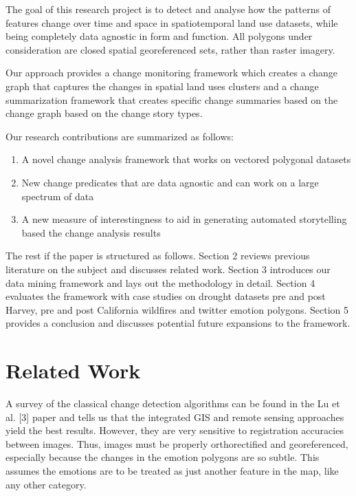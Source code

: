 \documentclass[conference]{IEEEtran}
\begin{document}
The goal of this research project is to detect and analyse how the patterns of features change over time and space in spatiotemporal land use datasets, while being completely data agnostic in form and function. All polygons under consideration are closed spatial  georeferenced sets, rather than raster imagery.

Our approach provides a change monitoring framework which creates a change graph that captures the changes in spatial land uses clusters and a change summarization framework that creates specific change summaries based on the change graph based on the change story types. 

Our research contributions are summarized as follows:

\begin{enumerate}
 \item A novel change analysis framework that works on vectored polygonal datasets
 \item New change predicates that are data agnostic and can work on a large spectrum of data
 \item A new measure of interestingness to aid in generating automated storytelling based the change analysis results
\end{enumerate}

The rest if the paper is structured as follows. Section 2 reviews previous literature on the subject and discusses related work.  Section 3 introduces our data mining framework and lays out the methodology in detail. Section 4 evaluates the framework with case studies on drought datasets pre and post Harvey, pre and post California wildfires and twitter emotion polygons. Section 5 provides a conclusion and discusses potential future expansions to the framework.


\section{Related Work}

A survey of the classical change detection algorithms can be found in the Lu et al. [3] paper and tells us that the integrated GIS and remote sensing approaches yield the best results. However, they are very sensitive to registration accuracies between images. Thus, images must be properly orthorectified and georeferenced, especially because the changes in the emotion polygons are so subtle. This assumes the emotions are to be treated as just another feature in the map, like any other category.
\end{document}
